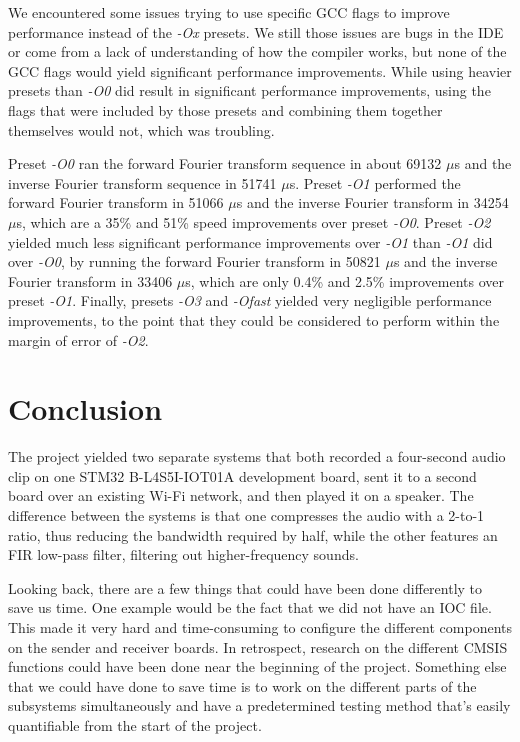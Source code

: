 \documentclass[journal]{IEEEtran}
\begin{document}
\vspace{10pt}
We encountered some issues trying to use specific GCC flags to improve performance instead of the \textit{-Ox} presets. We still those issues are bugs in the IDE or come from a lack of understanding of how the compiler works, but none of the GCC flags would yield significant performance improvements. While using heavier presets than \textit{-O0} did result in significant performance improvements, using the flags that were included by those presets and combining them together themselves would not, which was troubling.

\vspace{10pt}
Preset \textit{-O0} ran the forward Fourier transform sequence in about 69132 $\mu$s and the inverse Fourier transform sequence in 51741 $\mu$s. Preset \textit{-O1} performed the forward Fourier transform in 51066 $\mu$s and the inverse Fourier transform in 34254 $\mu$s, which are a 35\% and 51\% speed improvements over preset \textit{-O0}. Preset \textit{-O2} yielded much less significant performance improvements over \textit{-O1} than \textit{-O1} did over \textit{-O0}, by running the forward Fourier transform in 50821 $\mu$s and the inverse Fourier transform in 33406 $\mu$s, which are only 0.4\% and 2.5\% improvements over preset \textit{-O1}. Finally, presets \textit{-O3} and \textit{-Ofast} yielded very negligible performance improvements, to the point that they could be considered to perform within the margin of error of \textit{-O2}.

\section{Conclusion}

The project yielded two separate systems that both recorded a four-second audio clip on one STM32 B-L4S5I-IOT01A development board, sent it to a second board over an existing Wi-Fi network, and then played it on a speaker. The difference between the systems is that one compresses the audio with a 2-to-1 ratio, thus reducing the bandwidth required by half, while the other features an FIR low-pass filter, filtering out higher-frequency sounds. 

Looking back, there are a few things that could have been done differently to save us time. One example would be the fact that we did not have an IOC file. This made it very hard and time-consuming to configure the different components on the sender and receiver boards. In retrospect, research on the different CMSIS functions could have been done near the beginning of the project. Something else that we could have done to save time is to work on the different parts of the subsystems simultaneously and have a predetermined testing method that’s easily quantifiable from the start of the project. 
\end{document}
